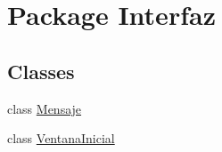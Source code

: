 \hypertarget{namespace_interfaz}{}\section{Package Interfaz}
\label{namespace_interfaz}
\subsection*{Classes}
\begin{DoxyCompactItemize}
\item 
class \mbox{\hyperlink{class_interfaz_1_1_mensaje}{Mensaje}}
\item 
class \mbox{\hyperlink{class_interfaz_1_1_ventana_inicial}{Ventana\+Inicial}}
\end{DoxyCompactItemize}

